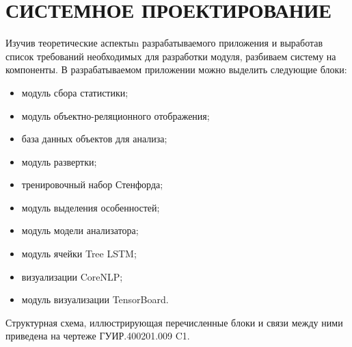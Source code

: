 \section{СИСТЕМНОЕ ПРОЕКТИРОВАНИЕ}\label{sec:sys}
Изучив теоретические аспектыn разрабатываемого приложения и выработав список требований необходимых для разработки модуля, разбиваем систему на компоненты.
В разрабатываемом приложении можно выделить следующие блоки:
\begin{itemize}
\item модуль сбора статистики;
\item модуль объектно-реляционного отображения;
\item база данных объектов для анализа;
\item модуль развертки;
\item тренировочный набор Стенфорда;
\item модуль выделения особенностей;
\item модуль модели анализатора;
\item модуль ячейки Tree LSTM\@;
\item визуализации CoreNLP\@;
\item модуль визуализации TensorBoard.
\end{itemize}
Структурная схема, иллюстрирующая перечисленные блоки и связи между ними приведена на чертеже ГУИР.400201.009 C1.


